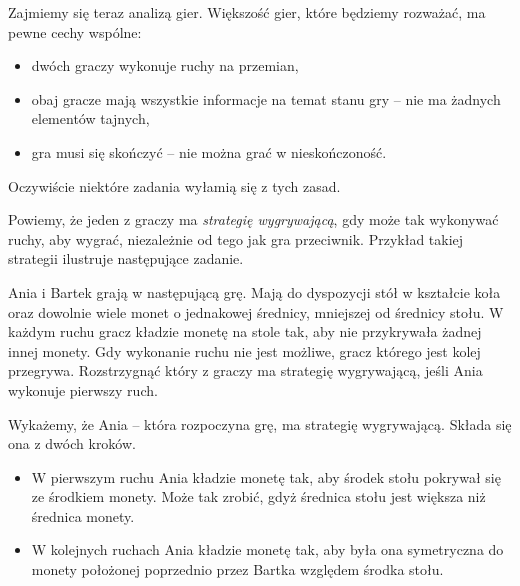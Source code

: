 

\noindent
Zajmiemy się teraz analizą gier. Większość gier, które będziemy rozważać, ma pewne cechy wspólne:
\begin{itemize}
	\item dwóch graczy wykonuje ruchy na przemian,
	\item obaj gracze mają wszystkie informacje na temat stanu gry -- nie ma żadnych elementów tajnych,
	\item gra musi się skończyć -- nie można grać w nieskończoność.
\end{itemize}
Oczywiście niektóre zadania wyłamią się z tych zasad.

\vspace{10px}
\noindent
Powiemy, że jeden z graczy ma \textit{strategię wygrywającą}, gdy może tak wykonywać ruchy, aby wygrać, niezależnie od tego jak gra przeciwnik. Przykład takiej strategii ilustruje następujące zadanie.

\vspace{10px}



\noindent
Ania i Bartek grają w następującą grę. Mają do dyspozycji stół w kształcie koła oraz dowolnie wiele monet o jednakowej średnicy, mniejszej od średnicy stołu. W każdym ruchu gracz kładzie monetę na stole tak, aby nie przykrywała żadnej innej monety. Gdy wykonanie ruchu nie jest możliwe, gracz którego jest kolej przegrywa. Rozstrzygnąć który z graczy ma strategię wygrywającą, jeśli Ania wykonuje pierwszy ruch.

\vspace{5px}


\noindent
Wykażemy, że Ania -- która rozpoczyna grę, ma strategię wygrywającą. Składa się ona z dwóch kroków.

\begin{itemize}
	\item W pierwszym ruchu Ania kładzie monetę tak, aby środek stołu pokrywał się ze środkiem monety. Może tak zrobić, gdyż średnica stołu jest większa niż średnica monety.
	\item W kolejnych ruchach Ania kładzie monetę tak, aby była ona symetryczna do monety położonej poprzednio przez Bartka względem środka stołu.
\end{itemize}


